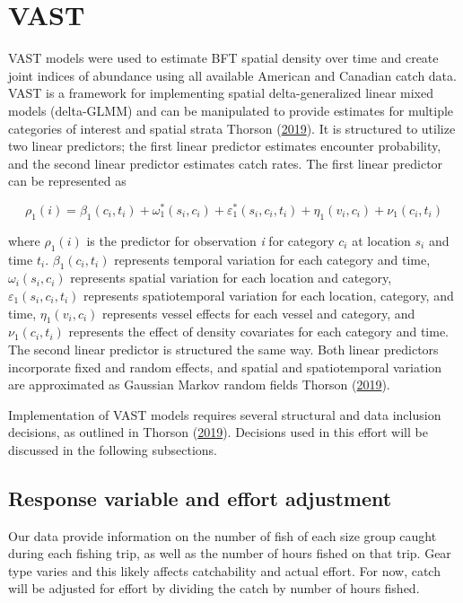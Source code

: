 \documentclass[
]{article}
\begin{document}
\hypertarget{vast}{%
\section{VAST}\label{vast}}

VAST models were used to estimate BFT spatial density over time and create joint indices of abundance using all available American and Canadian catch data. VAST is a framework for implementing spatial delta-generalized linear mixed models (delta-GLMM) and can be manipulated to provide estimates for multiple categories of interest and spatial strata Thorson (\protect\hyperlink{ref-thorson_2019}{2019}). It is structured to utilize two linear predictors; the first linear predictor estimates encounter probability, and the second linear predictor estimates catch rates. The first linear predictor can be represented as

\[\rho_1(i) = \beta_1(c_i, t_i) + \omega_1^*(s_i, c_i) + \varepsilon_1^*(s_i, c_i, t_i) + \eta_1(v_i, c_i) + \nu_1(c_i, t_i)\]

where \(\rho_1(i)\) is the predictor for observation \emph{i} for category \(c_i\) at location \(s_i\) and time \(t_i\). \(\beta_1(c_i, t_i)\) represents temporal variation for each category and time, \(\omega_i(s_i, c_i)\) represents spatial variation for each location and category, \(\varepsilon_1(s_i, c_i, t_i)\) represents spatiotemporal variation for each location, category, and time, \(\eta_1(v_i, c_i)\) represents vessel effects for each vessel and category, and \(\nu_1(c_i, t_i)\) represents the effect of density covariates for each category and time. The second linear predictor is structured the same way. Both linear predictors incorporate fixed and random effects, and spatial and spatiotemporal variation are approximated as Gaussian Markov random fields Thorson (\protect\hyperlink{ref-thorson_2019}{2019}).

Implementation of VAST models requires several structural and data inclusion decisions, as outlined in Thorson (\protect\hyperlink{ref-thorson_2019}{2019}). Decisions used in this effort will be discussed in the following subsections.

\hypertarget{response-variable-and-effort-adjustment}{%
\subsection{Response variable and effort adjustment}\label{response-variable-and-effort-adjustment}}

Our data provide information on the number of fish of each size group caught during each fishing trip, as well as the number of hours fished on that trip. Gear type varies and this likely affects catchability and actual effort. For now, catch will be adjusted for effort by dividing the catch by number of hours fished.
\end{document}
